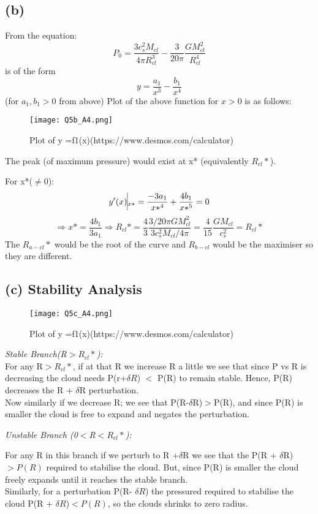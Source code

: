 \documentclass[11pt]{article}
\begin{document}
	
	\subsection{(b)}
	
	From the equation:
	\[
		P_0 = \frac{3c_s^2M_{cl}}{4\pi R_{cl}^3} - \frac{3}{20\pi}\frac{GM_{cl}^2}{R_{cl}^4}
	\]
	is of the form
	\[
		y = \frac{a_1}{x^3} - \frac{b_1}{x^4}
	\]
	(for $a_1,b_1 > 0$ from above)
	Plot of the above function for $x>0$ is as follows:
	\begin{figure}[h]
		\centering\texttt{[image: Q5b\_A4.png]}
		\caption{Plot of y =f1(x)(https://www.desmos.com/calculator)} 
		\label{fig:figure1}
	\end{figure}
	
	The peak (of maximum pressure) would exist at x* (equivalently $R_{cl}*$).
	
	For x*($\neq 0$):
	\[
		y'(x)\vline_{x*} = \frac{-3a_1}{x*^4} + \frac{4b_1}{x*^5} = 0
	\]
	\[
		\Rightarrow x* = \frac{4b_1}{3a_1} \Rightarrow R_{cl}* = \frac{4}{3}\frac{3/20\pi GM_{cl}^2}{3c_s^2M_{cl}/4\pi} = \boxed{\frac{4}{15} \frac{GM_{cl}}{c_s^2} = R_{cl}*}
	\]
	The $R_{a-cl}*$  would be the root of the curve and $R_{b-cl}$ would be the maximiser so they are different.
	 
	\subsection{(c) Stability Analysis}
	\begin{figure}[h]
		\centering\texttt{[image: Q5c\_A4.png]}
		\caption{Plot of y =f1(x)(https://www.desmos.com/calculator)} 
		\label{fig:figure1}
	\end{figure}
	\textit{Stable Branch(R$> R_{cl}*$):}\\
	
	For any R$> R_{cl}*$, if at that R we increase R a little we see that since P vs R is decreasing the cloud needs P(r+$\delta R$) $<$ P(R) to remain stable. Hence, P(R) decreases the R + $\delta$R perturbation.\\
	Now similarly if we decrease R; we see that P(R-$\delta$R)$>$P(R), and since P(R) is smaller the cloud is free to expand and negates the perturbation.
	
	\textit{Unstable Branch (0$<$R$<R_{cl}*$):}
	
	For any R in this branch if we perturb to R +$\delta$R we see that the P(R + $\delta$R) $>P(R)$ required to stabilise the cloud. But, since P(R) is smaller the cloud freely expands until it reaches the stable branch.\\
	Similarly, for a perturbation P(R- $\delta R$) the pressured required to stabilise the cloud P(R + $\delta R$)$<P(R)$, so the clouds shrinks to zero radius.
	 
\end{document}
